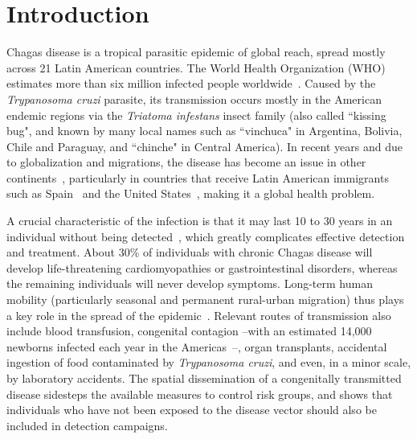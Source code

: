
\chapter{Introduction} \label{cha:intro}

Chagas disease is a tropical parasitic epidemic of global reach, spread mostly across 21 Latin American countries. The World Health Organization (WHO) estimates more than six million infected people worldwide~\cite{who2016}. Caused by the \textit{Trypanosoma cruzi} parasite, its transmission occurs mostly in the American endemic regions via the \textit{Triatoma infestans} insect family (also called ``kissing bug", and known by many local names such as ``vinchuca" in Argentina, Bolivia, Chile and Paraguay, and ``chinche" in Central America). In recent years and due to globalization and migrations, the disease has become an %
issue in other continents~\cite{schmunis2010chagas}, 
particularly in countries that receive Latin American immigrants such as Spain~\cite{navarro2012chagas} and the United States~\cite{hotez2013unfolding}, 
making it a global health problem.

A crucial characteristic of the infection is that it may last 10 to 30 years in an individual without being detected~\cite{rassi2012american}, which greatly complicates effective detection and treatment. About 30\% of individuals with chronic Chagas disease will develop life-threatening cardiomyopathies or gastrointestinal disorders, whereas 
the remaining individuals will never develop symptoms.
Long-term human mobility (particularly seasonal and permanent rural-urban migration) thus plays a key role in the spread of the epidemic~\cite{briceno2009chagas}. Relevant routes of transmission also include blood transfusion, congenital contagion --with an estimated 14,000 newborns infected each year in the Americas~\cite{OPS2006chagas}--,
organ transplants, 
accidental ingestion of food contaminated by \textit{Trypanosoma cruzi}, and even, in a minor scale, 
by laboratory accidents.
The spatial dissemination of a congenitally transmitted disease sidesteps the available measures to control risk groups, and shows that individuals who have not been exposed to the disease vector should also be included in detection campaigns.

